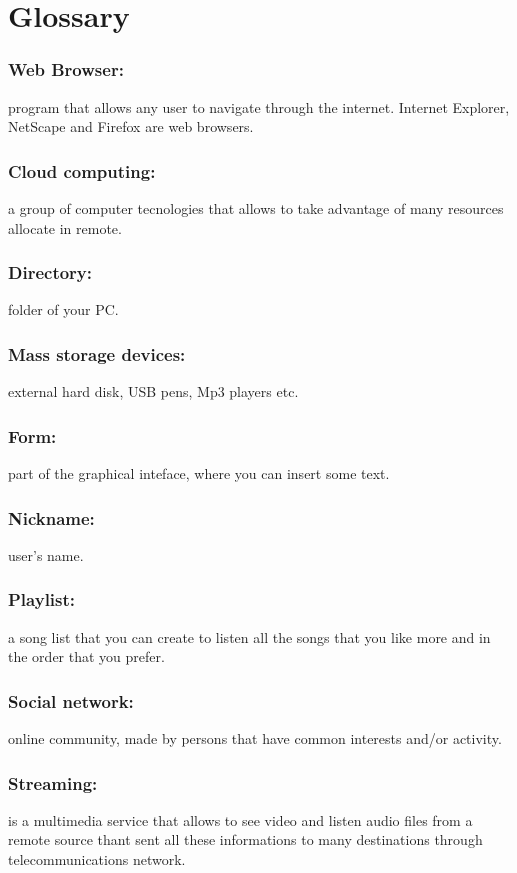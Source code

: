 \chapter{Glossary}
\thispagestyle{fancy}

\subsection*{Web Browser:} program that allows any user to navigate through the
internet. Internet Explorer, NetScape and Firefox are web browsers. 
\subsection*{Cloud computing:} a group of computer tecnologies that allows to
take advantage of many resources allocate in remote. 
\subsection*{Directory:}
folder of your PC. 
\subsection*{Mass storage devices:} external hard disk, USB pens, Mp3 players
etc. 
\subsection*{Form:} part of the graphical inteface, where you can insert some
text. 
\subsection*{Nickname:} user's name.
\subsection*{Playlist:} a song list that you can create to listen all the songs
that you like more and in the order that you prefer. 
\subsection*{Social network:} online community, made by persons that have common interests
and/or activity.
\subsection*{Streaming:} is a multimedia service that allows to see video and
listen audio files from a remote source thant sent all these informations to
many destinations through telecommunications network.

